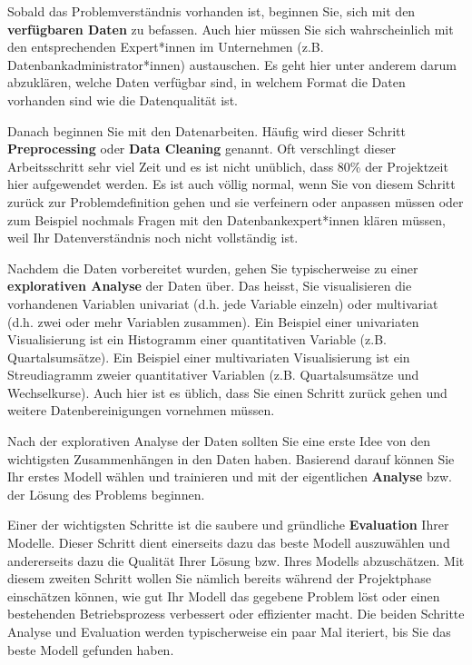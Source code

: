 \documentclass[
]{book}
\begin{document}
Sobald das Problemverständnis vorhanden ist, beginnen Sie, sich mit den \textbf{verfügbaren Daten} zu befassen. Auch hier müssen Sie sich wahrscheinlich mit den entsprechenden Expert*innen im Unternehmen (z.B. Datenbankadministrator*innen) austauschen. Es geht hier unter anderem darum abzuklären, welche Daten verfügbar sind, in welchem Format die Daten vorhanden sind wie die Datenqualität ist.

Danach beginnen Sie mit den Datenarbeiten. Häufig wird dieser Schritt \textbf{Preprocessing} oder \textbf{Data Cleaning} genannt. Oft verschlingt dieser Arbeitsschritt sehr viel Zeit und es ist nicht unüblich, dass 80\% der Projektzeit hier aufgewendet werden. Es ist auch völlig normal, wenn Sie von diesem Schritt zurück zur Problemdefinition gehen und sie verfeinern oder anpassen müssen oder zum Beispiel nochmals Fragen mit den Datenbankexpert*innen klären müssen, weil Ihr Datenverständnis noch nicht vollständig ist.

Nachdem die Daten vorbereitet wurden, gehen Sie typischerweise zu einer \textbf{explorativen Analyse} der Daten über. Das heisst, Sie visualisieren die vorhandenen Variablen univariat (d.h. jede Variable einzeln) oder multivariat (d.h. zwei oder mehr Variablen zusammen). Ein Beispiel einer univariaten Visualisierung ist ein Histogramm einer quantitativen Variable (z.B. Quartalsumsätze). Ein Beispiel einer multivariaten Visualisierung ist ein Streudiagramm zweier quantitativer Variablen (z.B. Quartalsumsätze und Wechselkurse). Auch hier ist es üblich, dass Sie einen Schritt zurück gehen und weitere Datenbereinigungen vornehmen müssen.

Nach der explorativen Analyse der Daten sollten Sie eine erste Idee von den wichtigsten Zusammenhängen in den Daten haben. Basierend darauf können Sie Ihr erstes Modell wählen und trainieren und mit der eigentlichen \textbf{Analyse} bzw. der Lösung des Problems beginnen.

Einer der wichtigsten Schritte ist die saubere und gründliche \textbf{Evaluation} Ihrer Modelle. Dieser Schritt dient einerseits dazu das beste Modell auszuwählen und andererseits dazu die Qualität Ihrer Lösung bzw. Ihres Modells abzuschätzen. Mit diesem zweiten Schritt wollen Sie nämlich bereits während der Projektphase einschätzen können, wie gut Ihr Modell das gegebene Problem löst oder einen bestehenden Betriebsprozess verbessert oder effizienter macht. Die beiden Schritte Analyse und Evaluation werden typischerweise ein paar Mal iteriert, bis Sie das beste Modell gefunden haben.
\end{document}
